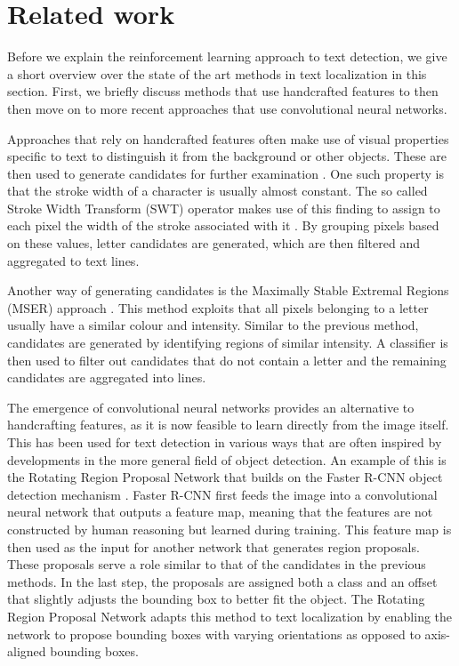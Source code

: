 \section{Related work}

Before we explain the reinforcement learning approach to text
detection, we give a short overview over the state of the art methods
in text localization in this section. First, we briefly discuss
methods that use handcrafted features to then then move on to more
recent approaches that use convolutional neural networks.

Approaches that rely on handcrafted features often make use of visual properties specific to text to distinguish it from 
the background or other objects. These are then used to generate candidates for further examination \cite{zhu2016scene}. One such property is that 
the stroke width of a character is usually almost constant. The so called Stroke Width Transform (SWT) operator makes use of this finding to assign 
to each pixel the width of the stroke associated with it \cite{epshtein2010detecting}. By grouping pixels based on these values, letter candidates 
are generated, which are then filtered and aggregated to text lines.

Another way of generating candidates is the Maximally Stable Extremal Regions (MSER) approach \cite{neumann2010method}. This method exploits that 
all pixels belonging to a letter usually have a similar colour and intensity. Similar to the previous method, candidates are generated by identifying
regions of similar intensity. A classifier is then used to filter out candidates that do not contain a letter and the remaining candidates are
aggregated into lines.

The emergence of convolutional neural networks provides an alternative to handcrafting features, as it is now feasible to learn directly from the 
image itself. This has been used for text detection in various ways that are often inspired by developments in the more general field of object 
detection. An example of this is the Rotating Region Proposal Network \cite{ma2018arbitrary} that builds on the Faster R-CNN object detection 
mechanism \cite{ren2015faster}. Faster R-CNN first feeds the image into a convolutional neural network that outputs a feature map, meaning that the 
features are not constructed by human reasoning but learned during training. This feature map is then used as the input for another network that 
generates region proposals. These proposals serve a role similar to that of the candidates in the previous methods. In the last step, 
the proposals are assigned both a class and an offset that slightly adjusts the bounding box to better fit the object. The Rotating Region Proposal
Network adapts this method to text localization by enabling the network to propose bounding boxes with varying orientations as opposed to 
axis-aligned bounding boxes.

